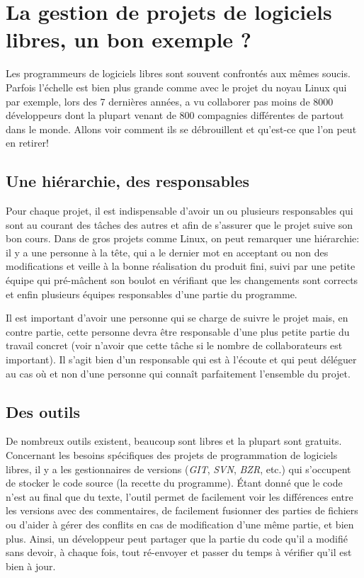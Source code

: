\section*{La gestion de projets de logiciels libres, un bon exemple ?}
Les programmeurs de logiciels libres sont souvent confrontés aux mêmes soucis. Parfois l'échelle est bien plus grande comme avec le projet du noyau Linux qui par exemple, lors des 7 dernières années, a vu collaborer pas moins de 8000 développeurs dont la plupart venant de 800 compagnies différentes de partout dans le monde. Allons voir comment ils se débrouillent et qu'est-ce que l'on peut en retirer!

\subsection*{Une hiérarchie, des responsables}
Pour chaque projet, il est indispensable d'avoir un ou plusieurs responsables qui sont au courant des tâches des autres et afin de s'assurer que le projet suive son bon cours.
Dans de gros projets comme Linux, on peut remarquer une hiérarchie: il y a une personne à la tête, qui a le dernier mot en acceptant ou non des modifications et veille à la bonne réalisation du produit fini, suivi par une petite équipe qui pré-mâchent son boulot en vérifiant que les changements sont corrects et enfin plusieurs équipes responsables d'une partie du programme.

Il est important d'avoir une personne qui se charge de suivre le projet mais, en contre partie, cette personne devra être responsable d'une plus petite partie du travail concret (voir n'avoir que cette tâche si le nombre de collaborateurs est important). Il s'agit bien d'un responsable qui est à l'écoute et qui peut déléguer au cas où et non d'une personne qui connaît parfaitement l'ensemble du projet.

\subsection*{Des outils}
De nombreux outils existent, beaucoup sont libres et la plupart sont gratuits.
Concernant les besoins spécifiques des projets de programmation de logiciels libres, il y a les gestionnaires de versions (\textit{GIT}, \textit{SVN}, \textit{BZR}, etc.) qui s'occupent de stocker le code source (la recette du programme). Étant donné que le code n'est au final que du texte, l'outil permet de facilement voir les différences entre les versions avec des commentaires, de facilement fusionner des parties de fichiers ou d'aider à gérer des conflits en cas de modification d'une même partie, et bien plus. Ainsi, un développeur peut partager que la partie du code qu'il a modifié sans devoir, à chaque fois, tout ré-envoyer et passer du temps à vérifier qu'il est bien à jour.\\

